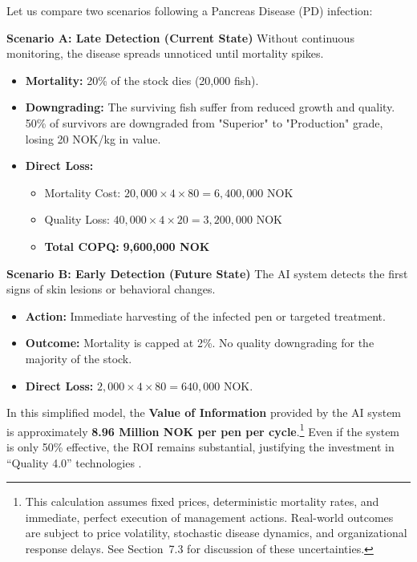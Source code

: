 \documentclass[12pt,a4paper]{article}
\begin{document}
Let us compare two scenarios following a Pancreas Disease (PD) infection:

\textbf{Scenario A: Late Detection (Current State)}
Without continuous monitoring, the disease spreads unnoticed until mortality spikes.
\begin{itemize}
    \item \textbf{Mortality:} 20\% of the stock dies (20,000 fish).
    \item \textbf{Downgrading:} The surviving fish suffer from reduced growth and quality. 50\% of survivors are downgraded from "Superior" to "Production" grade, losing 20 NOK/kg in value.
    \item \textbf{Direct Loss:}
    \begin{itemize}
        \item Mortality Cost: $20,000 \times 4 \times 80 = 6,400,000$ NOK
        \item Quality Loss: $40,000 \times 4 \times 20 = 3,200,000$ NOK
        \item \textbf{Total COPQ:} \textbf{9,600,000 NOK}
    \end{itemize}
\end{itemize}

\textbf{Scenario B: Early Detection (Future State)}
The AI system detects the first signs of skin lesions or behavioral changes.
\begin{itemize}
    \item \textbf{Action:} Immediate harvesting of the infected pen or targeted treatment.
    \item \textbf{Outcome:} Mortality is capped at 2\%. No quality downgrading for the majority of the stock.
    \item \textbf{Direct Loss:} $2,000 \times 4 \times 80 = 640,000$ NOK.
\end{itemize}

In this simplified model, the \textbf{Value of Information} provided by the AI system is approximately \textbf{8.96 Million NOK per pen per cycle}.\footnote{This calculation assumes fixed prices, deterministic mortality rates, and immediate, perfect execution of management actions. Real-world outcomes are subject to price volatility, stochastic disease dynamics, and organizational response delays. See Section~7.3 for discussion of these uncertainties.} Even if the system is only 50\% effective, the ROI remains substantial, justifying the investment in ``Quality 4.0'' technologies \citep{Tsung2023, 10.1108/TQM-11-2023-0361}.
\end{document}
